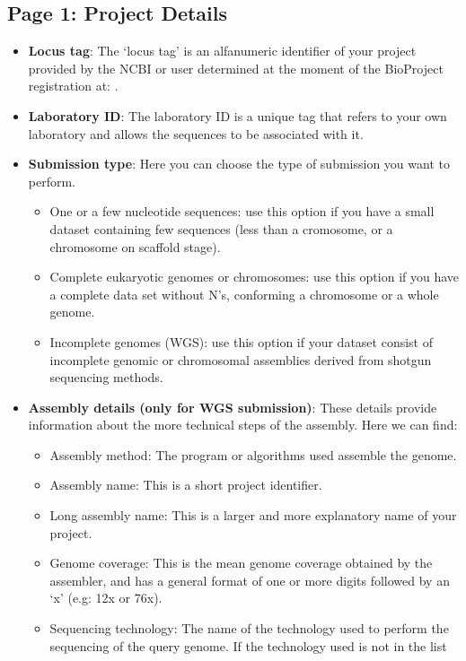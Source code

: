 \subsection {Page 1: Project Details}
\begin{itemize}
  \item \textbf{Locus tag}: The `locus tag' is an alfanumeric
  identifier of your project provided by the NCBI or user determined
  at the moment of the BioProject registration at:
  .
  \item \textbf{Laboratory ID}: The laboratory ID is a unique tag that refers to
  your own laboratory and allows the sequences to be associated with it.
  \item \textbf{Submission type}: Here you can choose the type of submission
  you want to perform.
  \begin{itemize}
    \item One or a few nucleotide sequences: use this option if you have a small
    dataset containing few sequences (less than a cromosome, or a
    chromosome on scaffold stage).
    \item Complete eukaryotic genomes or chromosomes: use this option if you have a
     complete data set without N's, conforming a chromosome or a whole genome.
    \item Incomplete genomes (WGS):  use this option if your dataset consist of
    incomplete genomic or chromosomal assemblies derived from shotgun sequencing
    methods.
    \end{itemize}
  \item \textbf{Assembly details (only for WGS submission)}: These details provide
  information about the more technical steps of the assembly.
  Here we can find:
	\begin{itemize}
 		\item Assembly method: The program or algorithms used assemble the genome.
 		\item Assembly name: This is a short project identifier.
 		\item Long assembly name: This is a larger and more explanatory name of your
 		project.
 		\item Genome coverage: This is the mean genome coverage obtained by the
 		assembler, and has a general format of one or more digits followed by an `x'
 		(e.g: 12x or 76x).
 		\item Sequencing technology: The name of the technology used to perform the
 		sequencing of the query genome. If the technology used is not in the list

\end{itemize}
\end{itemize}
